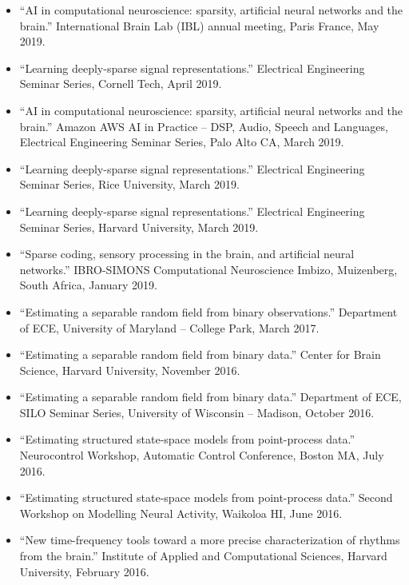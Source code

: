 \begin{itemize}
	\item ``AI in computational neuroscience: sparsity, artificial neural networks and the brain.''  International Brain Lab (IBL) annual meeting, Paris France, May 2019.
	\item ``Learning deeply-sparse signal representations.''  Electrical Engineering Seminar Series, Cornell Tech, April 2019.
	\item ``AI in computational neuroscience: sparsity, artificial neural networks and the brain.''  Amazon AWS AI in Practice -- DSP, Audio, Speech and Languages, Electrical Engineering Seminar Series, Palo Alto CA, March 2019.
	\item ``Learning deeply-sparse signal representations.''  Electrical Engineering Seminar Series, Rice University, March 2019.
	\item ``Learning deeply-sparse signal representations.''  Electrical Engineering Seminar Series, Harvard University, March 2019.
	\item ``Sparse coding, sensory processing in the brain, and artificial neural networks.'' IBRO-SIMONS Computational Neuroscience Imbizo, Muizenberg, South Africa, January 2019.
	\item ``Estimating a separable random field from binary observations.'' Department of ECE, University of Maryland -- College Park, March 2017.
    \item ``Estimating a separable random field from binary data.'' Center for Brain Science, Harvard University, November 2016.
    \item ``Estimating a separable random field from binary data.'' Department of ECE, SILO Seminar Series, University of Wisconsin -- Madison, October 2016.
   	\item ``Estimating structured state-space models from point-process data.'' Neurocontrol Workshop, Automatic Control Conference, Boston MA, July 2016.
    \item ``Estimating structured state-space models from point-process data.'' Second Workshop on Modelling Neural Activity, Waikoloa HI, June 2016.
    \item ``New time-frequency tools toward a more precise characterization of rhythms from the brain.'' Institute of Applied and Computational Sciences, Harvard University, February 2016.

\end{itemize}
